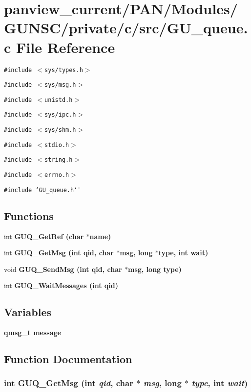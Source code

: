 \section{panview\_\-current/PAN/Modules/GUNSC/private/c/src/GU\_\-queue.c File Reference}
\label{GU__queue_8c}
{\tt \#include $<$sys/types.h$>$}\par
{\tt \#include $<$sys/msg.h$>$}\par
{\tt \#include $<$unistd.h$>$}\par
{\tt \#include $<$sys/ipc.h$>$}\par
{\tt \#include $<$sys/shm.h$>$}\par
{\tt \#include $<$stdio.h$>$}\par
{\tt \#include $<$string.h$>$}\par
{\tt \#include $<$errno.h$>$}\par
{\tt \#include \char`\"{}GU\_\-queue.h\char`\"{}}\par
\subsection*{Functions}
\begin{CompactItemize}
\item 
int \bf{GUQ\_\-Get\-Ref} (char $\ast$name)
\item 
int \bf{GUQ\_\-Get\-Msg} (int qid, char $\ast$msg, long $\ast$type, int wait)
\item 
void \bf{GUQ\_\-Send\-Msg} (int qid, char $\ast$msg, long type)
\item 
int \bf{GUQ\_\-Wait\-Messages} (int qid)
\end{CompactItemize}
\subsection*{Variables}
\begin{CompactItemize}
\item 
\bf{qmsg\_\-t} \bf{message}
\end{CompactItemize}


\subsection{Function Documentation}
\subsubsection{\setlength{\rightskip}{0pt plus 5cm}int GUQ\_\-Get\-Msg (int {\em qid}, char $\ast$ {\em msg}, long $\ast$ {\em type}, int {\em wait})}\label{GU__queue_8c_cf4df06095d6e1f73bcd7dbdfbe8d4bb}


